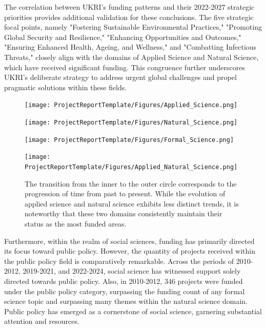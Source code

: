 The correlation between UKRI's funding patterns and their 2022-2027 strategic priorities provides additional validation for these conclusions. The five strategic focal points, namely "Fostering Sustainable Environmental Practices," "Promoting Global Security and Resilience," "Enhancing Opportunities and Outcomes," "Ensuring Enhanced Health, Ageing, and Wellness," and "Combatting Infectious Threats," closely align with the domains of Applied Science and Natural Science, which have received significant funding. This congruence further underscores UKRI's deliberate strategy to address urgent global challenges and propel pragmatic solutions within these fields.
\begin{figure}[H]
    \centering
    \begin{minipage}{0.49\textwidth}
        \centering
        \texttt{[image: ProjectReportTemplate/Figures/Applied\_Science.png]}
      
    \end{minipage}
    \hfill
    \begin{minipage}{0.49\textwidth}
        \centering
        \texttt{[image: ProjectReportTemplate/Figures/Natural\_Science.png]}
       
    \end{minipage}
    
    \begin{minipage}{0.49\textwidth}
        \centering
        \texttt{[image: ProjectReportTemplate/Figures/Formal\_Science.png]}
    
    \end{minipage}
    \hfill
    \begin{minipage}{0.49\textwidth}
        \centering
        \texttt{[image: ProjectReportTemplate/Figures/Applied\_Natural\_Science.png]}
     
    \end{minipage}
    \caption[Proportional Trends Shifting in Research Landscape]{The transition from the inner to the outer circle corresponds to the progression of time from past to present. While the evolution of applied science and natural science exhibits less distinct trends, it is noteworthy that these two domains consistently maintain their status as the most funded areas.}
    \label{fig:combined}
\end{figure}


Furthermore, within the realm of social sciences, funding has primarily directed its focus toward public policy. However, the quantity of projects received within the public policy field is comparatively remarkable. Across the periods of 2010-2012, 2019-2021, and 2022-2024, social science has witnessed support solely directed towards public policy. Also, in 2010-2012, 346 projects were funded under the public policy category, surpassing the funding count of any formal science topic and surpassing many themes within the natural science domain. Public policy has emerged as a cornerstone of social science, garnering substantial attention and resources.\\

